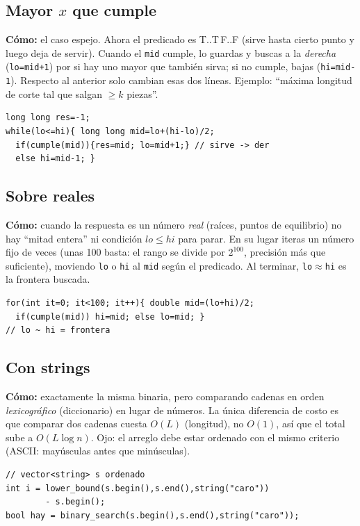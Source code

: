 \documentclass[10pt,a4paper,twocolumn]{article}
\begin{document}
\subsection{Mayor $x$ que cumple}
\textbf{Cómo:} el caso espejo. Ahora el predicado es T..T\,F..F (sirve
hasta cierto punto y luego deja de servir). Cuando el \texttt{mid}
cumple, lo guardas y buscas a la \emph{derecha} (\texttt{lo=mid+1}) por
si hay uno mayor que también sirva; si no cumple, bajas
(\texttt{hi=mid-1}). Respecto al anterior solo cambian esas dos líneas.
Ejemplo: ``máxima longitud de corte tal que salgan $\geq k$ piezas''.
\begin{lstlisting}[style=cpp]
long long res=-1;
while(lo<=hi){ long long mid=lo+(hi-lo)/2;
  if(cumple(mid)){res=mid; lo=mid+1;} // sirve -> der
  else hi=mid-1; }
\end{lstlisting}


\subsection{Sobre reales}
\textbf{Cómo:} cuando la respuesta es un número \emph{real} (raíces,
puntos de equilibrio) no hay ``mitad entera'' ni condición $lo\leq hi$
para parar. En su lugar iteras un número fijo de veces (unas 100 basta:
el rango se divide por $2^{100}$, precisión más que suficiente),
moviendo \texttt{lo} o \texttt{hi} al \texttt{mid} según el predicado.
Al terminar, \texttt{lo}$\approx$\texttt{hi} es la frontera buscada.
\begin{lstlisting}[style=cpp]
for(int it=0; it<100; it++){ double mid=(lo+hi)/2;
  if(cumple(mid)) hi=mid; else lo=mid; }
// lo ~ hi = frontera
\end{lstlisting}


\subsection{Con strings}
\textbf{Cómo:} exactamente la misma binaria, pero comparando cadenas en
orden \emph{lexicográfico} (diccionario) en lugar de números. La única
diferencia de costo es que comparar dos cadenas cuesta $O(L)$ (longitud),
no $O(1)$, así que el total sube a $O(L\log n)$. Ojo: el arreglo debe
estar ordenado con el mismo criterio (ASCII: mayúsculas antes que
minúsculas).
\begin{lstlisting}[style=cpp]
// vector<string> s ordenado
int i = lower_bound(s.begin(),s.end(),string("caro"))
        - s.begin();
bool hay = binary_search(s.begin(),s.end(),string("caro"));
\end{lstlisting}
\end{document}
